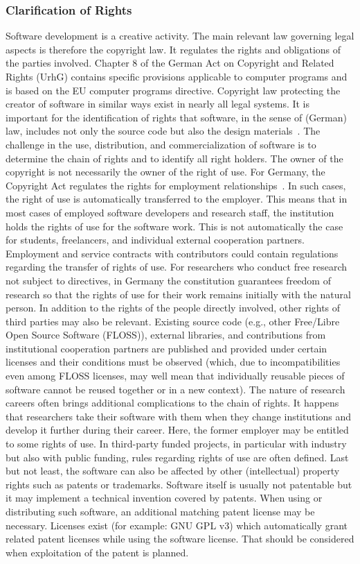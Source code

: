 \documentclass[a4paper,num-refs,numbers,sort&compress]{de-rse}
\begin{document}
\subsubsection{Clarification of Rights}
Software development is a creative activity. The main relevant law governing legal aspects is therefore the copyright law. It regulates the rights and obligations of the parties involved. Chapter 8 of the German Act on Copyright and Related Rights (UrhG) contains specific provisions applicable to computer programs and is based on the EU computer programs directive. Copyright law protecting the creator of software in similar ways exist in nearly all legal systems. It is important for the identification of rights that software, in the sense of (German) law, includes not only the source code but also the design materials~\cite{BMJVurheber69a}. The challenge in the use, distribution, and commercialization of software is to determine the chain of rights and to identify all right holders. The owner of the copyright is not necessarily the owner of the right of use. For Germany, the Copyright Act regulates the rights for employment relationships~\cite{BMJVurheber69b}. In such cases, the right of use is automatically transferred to the employer. This means that in most cases of employed software developers and research staff, the institution holds the rights of use for the software work. This is not automatically the case for students, freelancers, and individual external cooperation partners. Employment and service contracts with contributors could contain regulations regarding the transfer of rights of use. For researchers who conduct free research not subject to directives, in Germany the constitution guarantees freedom of research so that the rights of use for their work remains initially with the natural person. In addition to the rights of the people directly involved, other rights of third parties may also be relevant. Existing source code (e.g., other Free/Libre Open Source Software (FLOSS)), external libraries, and contributions from institutional cooperation partners are published and provided under certain licenses and their conditions must be observed (which, due to incompatibilities even among FLOSS licenses,
may well mean that individually reusable pieces of software cannot be 
reused together or in a new context). The nature of research careers often brings additional complications to the chain of rights. It happens that researchers take their software with them when they change institutions and develop it further during their career. Here, the former employer may be entitled to some rights of use. In third-party funded projects, in particular with industry but also with public funding, rules regarding rights of use are often defined. Last but not least, the software can also be affected by other (intellectual) property rights such as patents or trademarks. Software itself is usually not patentable but it may implement a technical invention covered by patents. When using or distributing such software, an additional matching patent license may be necessary. Licenses exist (for example: GNU GPL v3) which automatically grant related patent licenses while using the software license. That should be considered when exploitation of the patent is planned.
\end{document}
